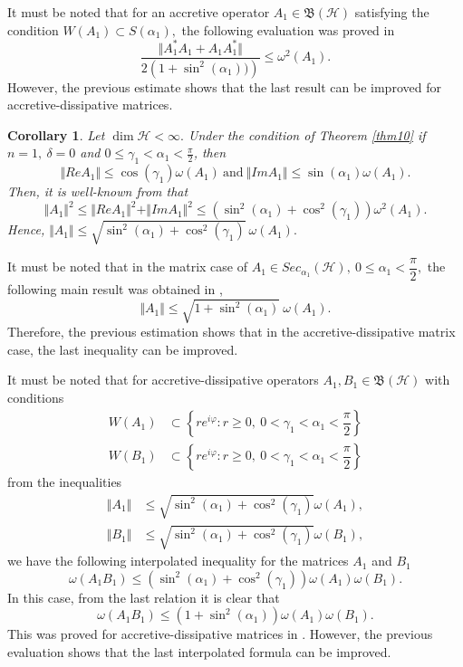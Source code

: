 \documentclass[12pt]{article}
\newtheorem{corollary}{Corollary}
\begin{document}
It must be noted that for an accretive operator $ A_{1}\in\mathfrak{B}(\mathcal{H})  $ satisfying the condition $ W(A_{1})\subset S(\alpha_{1}) ,$  the following evaluation was proved in \cite{Sammour2022}
\[
\dfrac{\Vert A_{1}^{*}A_{1}+A_{1}A_{1}^{*}\Vert} {2\left( 1+\sin^{2}(\alpha_{1}))\right) } \leq \omega ^{2}(A_{1}).
\]
However, the previous estimate shows that the last result can be improved for accretive-dissipative matrices.
\begin{corollary}
\label{cor13}
Let $ \dim\mathcal{H}<\infty. $ Under the condition of Theorem \ref{thm10} if $ n=1, \ \delta=0 $ and $ 0\leq \gamma_{1} <\alpha_{1} < \frac{\pi}{2}  $, then
\[
\Vert ReA_{1}\Vert\leq \cos(\gamma_{1}) \omega(A_{1}) \ \text{and} \ \Vert ImA_{1}\Vert\leq \sin(\alpha_{1}) \omega(A_{1}).
\]
Then, it is well-known from \textnormal{\cite{Sammour2022}} that
\[
\Vert A_{1} \Vert^{2} \leq \Vert ReA_{1} \Vert^{2} + \Vert ImA_{1} \Vert^{2} \leq \left( \sin^{2}(\alpha_{1})+\cos^{2}(\gamma_{1}) \right) \omega^{2}(A_{1}).
\]
Hence,
\(
\Vert A_{1} \Vert\leq \sqrt{\sin^{2}(\alpha_{1})+\cos^{2}(\gamma_{1})} \  \omega(A_{1}).
\)
\end{corollary}

It must be noted that in the matrix case of $ A_{1}\in Sec_{\alpha_{1}}(\mathcal{H}), \ 0\leq \alpha_{1} <\dfrac{\pi}{2}, $ the following main result was obtained in \cite{Sammour2022},
\[
\Vert A_{1} \Vert\leq \sqrt{1+\sin^{2}(\alpha_{1})}\ \omega(A_{1}).
\]
Therefore, the previous estimation shows that in the accretive-dissipative matrix case, the last inequality can be improved.

It must be noted that for accretive-dissipative operators $ A_{1},B_{1}\in \mathfrak{B}(\mathcal{H}) $ with conditions
\begin{align*}
W(A_{1}) & \subset \left\lbrace  re^{i\varphi}: r\geq 0, \ 0< \gamma_{1}<\alpha_{1}<\dfrac{\pi}{2}\right\rbrace
\\
W(B_{1}) & \subset \left\lbrace  re^{i\varphi}: r\geq 0, \ 0< \gamma_{1}<\alpha_{1}<\dfrac{\pi}{2}\right\rbrace
\end{align*}
from the inequalities
\begin{align*}
\Vert A_{1} \Vert & \leq \sqrt{\sin^{2}(\alpha_{1})+\cos^{2}(\gamma_{1})}\omega(A_{1}),
\\
\Vert B_{1} \Vert & \leq \sqrt{\sin^{2}(\alpha_{1})+\cos^{2}(\gamma_{1})}\omega(B_{1}),
\end{align*}
we have the following interpolated inequality for the matrices $ A_{1} $ and $ B_{1} $
\[
\omega(A_{1}B_{1})\leq \left( \sin^{2}(\alpha_{1})+\cos^{2}(\gamma_{1}) \right) \omega(A_{1}) \omega(B_{1}).
\]
In this case, from the last relation it is clear that
\[
\omega(A_{1}B_{1})\leq \left( 1+\sin^{2}(\alpha_{1}) \right) \omega(A_{1}) \omega(B_{1}).
\]
This was proved for accretive-dissipative matrices in \cite{Sammour2022}. However, the previous evaluation shows that the last interpolated formula can be improved.
\end{document}
